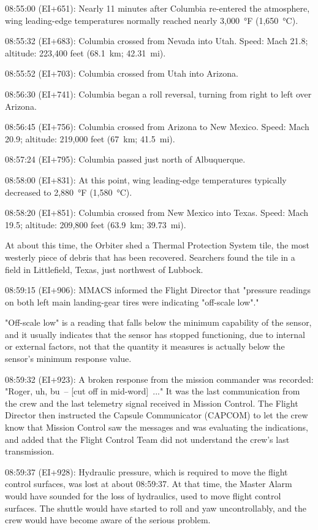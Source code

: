 08:55:00 (EI+651): Nearly 11 minutes after Columbia re-entered the
atmosphere, wing leading-edge temperatures normally reached nearly
3,000~°F (1,650~°C).

08:55:32 (EI+683): Columbia crossed from Nevada into Utah. Speed: Mach
21.8; altitude: 223,400 feet (68.1~km; 42.31~mi).

08:55:52 (EI+703): Columbia crossed from Utah into Arizona.

08:56:30 (EI+741): Columbia began a roll reversal, turning from right to
left over Arizona.

08:56:45 (EI+756): Columbia crossed from Arizona to New Mexico. Speed:
Mach 20.9; altitude: 219,000 feet (67~km; 41.5~mi).

08:57:24 (EI+795): Columbia passed just north of Albuquerque.

08:58:00 (EI+831): At this point, wing leading-edge temperatures
typically decreased to 2,880~°F (1,580~°C).

08:58:20 (EI+851): Columbia crossed from New Mexico into Texas. Speed:
Mach 19.5; altitude: 209,800 feet (63.9~km; 39.73~mi).

At about this time, the Orbiter shed a Thermal Protection System tile,
the most westerly piece of debris that has been recovered. Searchers
found the tile in a field in Littlefield, Texas, just northwest of
Lubbock.

08:59:15 (EI+906): MMACS informed the Flight Director that "pressure
readings on both left main landing-gear tires were indicating "off-scale
low"."

"Off-scale low" is a reading that falls below the minimum capability of
the sensor, and it usually indicates that the sensor has stopped
functioning, due to internal or external factors, not that the quantity
it measures is actually below the sensor's minimum response value.

08:59:32 (EI+923): A broken response from the mission commander was
recorded: "Roger, uh, bu~-- {[}cut off in mid-word{]}~..." It was the
last communication from the crew and the last telemetry signal received
in Mission Control. The Flight Director then instructed the Capsule
Communicator (CAPCOM) to let the crew know that Mission Control saw the
messages and was evaluating the indications, and added that the Flight
Control Team did not understand the crew's last transmission.

08:59:37 (EI+928): Hydraulic pressure, which is required to move the
flight control surfaces, was lost at about 08:59:37. At that time, the
Master Alarm would have sounded for the loss of hydraulics, used to move
flight control surfaces. The shuttle would have started to roll and yaw
uncontrollably, and the crew would have become aware of the serious
problem.

